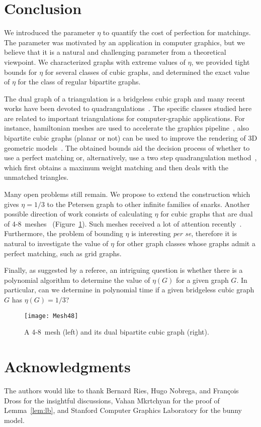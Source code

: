 \documentclass{article}
\begin{document}
\section{Conclusion}

We introduced the parameter $\eta$ to quantify the cost of perfection for matchings. The parameter was motivated by an application in computer graphics, but we believe that it is a natural and challenging parameter from a theoretical viewpoint. We characterized graphs with extreme values of $\eta$, we provided tight bounds for $\eta$ for several classes of cubic graphs, and determined the exact value of $\eta$ for the class of regular bipartite graphs.

The dual graph of a triangulation is a bridgeless cubic graph and many recent works have been devoted to quadrangulations~\cite{gopi04,remacle11,daniels11,tri2quad,lizier10a}.
The specific classes studied here are related to important triangulations for computer-graphic applications. 
For instance, hamiltonian  meshes are used to accelerate the graphics pipeline~\cite{arkin96,eppstein04}, also bipartite cubic graphs (planar or not) can be used to improve the rendering of 3D geometric models~\cite{sander08}. 
The obtained bounds aid the decision process of whether to use a perfect matching or, alternatively, use a two step quadrangulation method~\cite{tarini10}, which first obtains a maximum weight matching and then deals with the unmatched triangles.

Many open problems still remain.
We propose to extend the construction which gives $\eta = 1/3$ to the Petersen graph to other infinite families of snarks.
Another possible direction of work consists of calculating $\eta$ for cubic graphs that are dual of 4-8~meshes~\cite{velho01,velho03,velho04} (Figure~\ref{fig:48mesh}). Such meshes received a lot of attention recently~\cite{amorim12,goes08,weber07,goldenstein05}.
Furthermore, the problem of bounding $\eta$ is interesting \emph{per se}, therefore it is natural to investigate the value of $\eta$ for other graph classes whose graphs admit a perfect matching, such as grid graphs.

Finally, as suggested by a referee, an intriguing question is whether there is a polynomial algorithm to determine the value of $\eta(G)$ for a given graph $G$. In particular, can we determine in polynomial time if a given bridgeless cubic graph $G$ has $\eta(G)=1/3$?

\begin{figure}[ht]
\centering
\texttt{[image: Mesh48]}
\caption{A 4-8~mesh (left) and its dual bipartite cubic graph (right).}
\label{fig:48mesh}
\end{figure}

\section*{Acknowledgments}

The authors would like to thank Bernard Ries, Hugo Nobrega, and Fran\c{c}ois Dross for the insightful discussions,
Vahan Mkrtchyan for the proof of Lemma~\ref{lem:lb}, and Stanford Computer
Graphics Laboratory for the bunny model.



\end{document}
